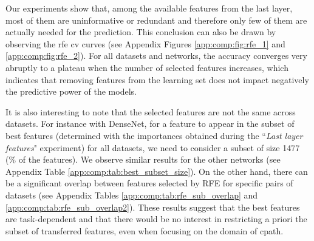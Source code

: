 Our experiments show that, among the available features from the last layer, most of them are uninformative or redundant and therefore only few of them are actually needed for the prediction. This conclusion can also be drawn by observing the \acrlong{rfe} \acrlong{cv} curves (see Appendix Figures \ref{app:comp:fig:rfe_1} and 
\ref{app:comp:fig:rfe_2}). For all datasets and networks, the accuracy converges very abruptly to a plateau when the number of selected features increases, which indicates that removing features from the learning set does not impact negatively the predictive power of the models.

It is also interesting to note that the selected features are not the same across datasets. For instance with DenseNet, for a feature to appear in the subset of best features (determined with the importances obtained during the ``\textit{Last layer features}" experiment) for all datasets, we need to consider a subset of size 1477 (\% of the features). We observe similar results for the other networks (see Appendix Table \ref{app:comp:tab:best_subset_size}). On the other hand, there can be a significant overlap between features selected by RFE for specific pairs of datasets (see Appendix Tables \ref{app:comp:tab:rfe_sub_overlap} and \ref{app:comp:tab:rfe_sub_overlap2}). These results suggest that the best features are task-dependent and that there would be no interest in restricting a priori the subset of transferred features, even when focusing on the domain of \acrlong{cpath}.
 
